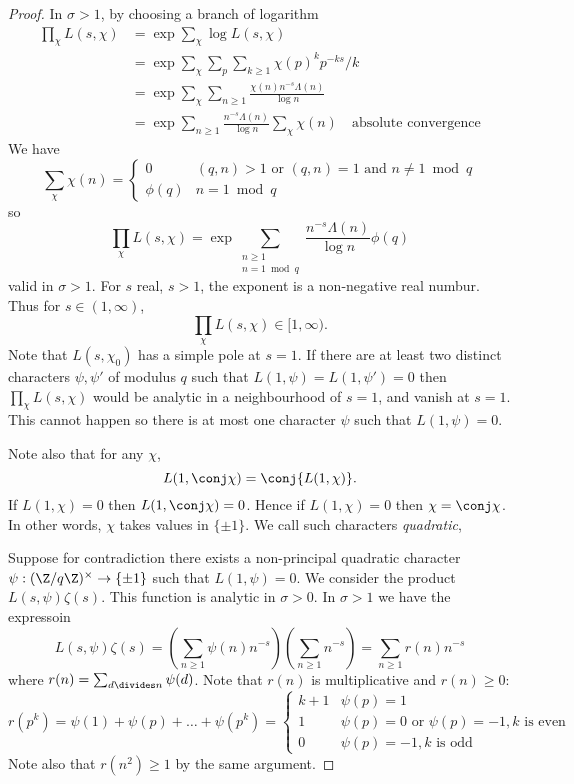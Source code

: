 \documentclass[a4paper]{article}
\theoremstyle{definition}
\begin{document}
\begin{proof}
  In \(\sigma > 1\), by choosing a branch of logarithm
  \begin{align*}
    \prod_\chi L(s, \chi)
    &= \exp \sum_\chi \log L(s, \chi) \\
    &= \exp \sum_\chi \sum_p \sum_{k \geq 1} \chi(p)^k p^{-ks}/k \\
    &= \exp \sum_\chi \sum_{n \geq 1} \frac{\chi(n) n^{-s} \Lambda(n)}{\log n} \\
    &= \exp \sum_{n \geq 1} \frac{n^{-s} \Lambda(n)}{\log n} \sum_\chi \chi(n) \quad \text{absolute convergence}
  \end{align*}
  We have
  \[
    \sum_\chi \chi(n) =
    \begin{cases}
      0 & (q, n) > 1 \text{ or } (q, n) = 1 \text{ and } n \neq 1 \bmod q \\
      \phi(q) & n = 1 \bmod q
    \end{cases}
  \]
  so
  \[
    \prod_\chi L(s, \chi)
    = \exp \sum_{\substack{n \geq 1 \\ n = 1 \bmod q}} \frac{n^{-s} \Lambda(n)}{\log n} \phi(q)
  \]
  valid in \(\sigma > 1\). For \(s\) real, \(s > 1\), the exponent is a non-negative real numbur. Thus for \(s \in (1, \infty)\),
  \[
    \prod_\chi L(s, \chi) \in [1, \infty).
  \]
  Note that \(L(s, \chi_0)\) has a simple pole at \(s = 1\). If there are at least two distinct characters \(\psi, \psi'\) of modulus \(q\) such that \(L(1, \psi) = L(1, \psi') = 0\) then \(\prod_\chi L(s, \chi)\) would be analytic in a neighbourhood of \(s = 1\), and vanish at \(s = 1\). This cannot happen so there is at most one character \(\psi\) such that \(L(1, \psi) = 0\).

  Note also that for any \(\chi\),
  \[
    L(1, \conj \chi) = \conj{L(1, \chi)}.
  \]
  If \(L(1, \chi) = 0\) then \(L(1, \conj \chi) = 0\). Hence if \(L(1, \chi) = 0\) then \(\chi = \conj \chi\). In other words, \(\chi\) takes values in \(\{\pm 1\}\). We call such characters \emph{quadratic},

  Suppose for contradiction there exists a non-principal quadratic character \(\psi: (\Z/q\Z)^\times \to \{\pm 1\}\) such that \(L(1, \psi) = 0\). We consider the product \(L(s, \psi) \zeta(s)\). This function is analytic in \(\sigma > 0\). In \(\sigma > 1\) we have the expressoin
  \[
    L(s, \psi) \zeta(s)
    = \left( \sum_{n \geq 1} \psi(n) n^{-s} \right) \left( \sum_{n \geq 1} n^{-s} \right)
    = \sum_{n \geq 1} r(n) n^{-s}
  \]
  where \(r(n) = \sum_{d \divides n} \psi(d)\). Note that \(r(n)\) is multiplicative and \(r(n) \geq 0\):
  \[
    r(p^k) = \psi(1) + \psi(p) + \dots + \psi(p^k) =
    \begin{cases}
      k + 1 & \psi(p) = 1 \\
      1 & \psi(p) = 0 \text{ or } \psi(p) = -1, k \text{ is even} \\
      0 & \psi(p) = -1, k \text{ is odd}
    \end{cases}
  \]
  Note also that \(r(n^2) \geq 1\) by the same argument.


\end{proof}
\end{document}
